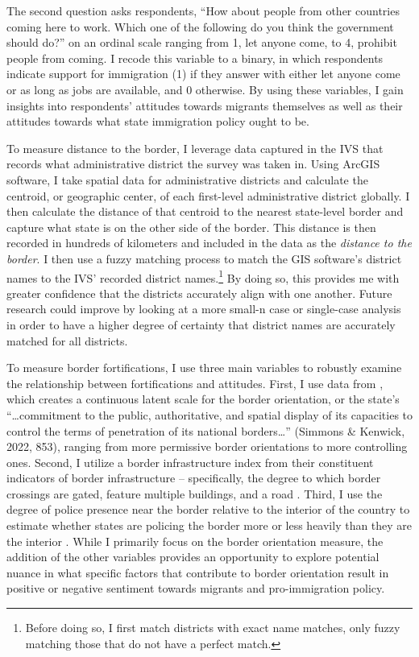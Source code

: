 \documentclass[12pt,]{article}
\begin{document}
The second question asks respondents, ``How about people from other
countries coming here to work. Which one of the following do you think
the government should do?'' on an ordinal scale ranging from 1, let
anyone come, to 4, prohibit people from coming. I recode this variable
to a binary, in which respondents indicate support for immigration (1)
if they answer with either let anyone come or as long as jobs are
available, and 0 otherwise. By using these variables, I gain insights
into respondents' attitudes towards migrants themselves as well as their
attitudes towards what state immigration policy ought to be.

To measure distance to the border, I leverage data captured in the IVS
that records what administrative district the survey was taken in. Using
ArcGIS software, I take spatial data for administrative districts and
calculate the centroid, or geographic center, of each first-level
administrative district globally. I then calculate the distance of that
centroid to the nearest state-level border and capture what state is on
the other side of the border. This distance is then recorded in hundreds
of kilometers and included in the data as the \emph{distance to the
border}. I then use a fuzzy matching process to match the GIS software's
district names to the IVS' recorded district names.\footnote{Before
  doing so, I first match districts with exact name matches, only fuzzy
  matching those that do not have a perfect match.} By doing so, this
provides me with greater confidence that the districts accurately align
with one another. Future research could improve by looking at a more
small-n case or single-case analysis in order to have a higher degree of
certainty that district names are accurately matched for all districts.

To measure border fortifications, I use three main variables to robustly
examine the relationship between fortifications and attitudes. First, I
use data from \citet{simmons2022}, which creates a continuous latent
scale for the border orientation, or the state's ``\ldots commitment to
the public, authoritative, and spatial display of its capacities to
control the terms of penetration of its national borders\ldots{}''
(Simmons \& Kenwick, 2022, 853), ranging from more permissive border
orientations to more controlling ones. Second, I utilize a border
infrastructure index from their constituent indicators of border
infrastructure -- specifically, the degree to which border crossings are
gated, feature multiple buildings, and a road \citep{simmons2022}.
Third, I use the degree of police presence near the border relative to
the interior of the country to estimate whether states are policing the
border more or less heavily than they are the interior
\citep{simmons2022}. While I primarily focus on the border orientation
measure, the addition of the other variables provides an opportunity to
explore potential nuance in what specific factors that contribute to
border orientation result in positive or negative sentiment towards
migrants and pro-immigration policy.
\end{document}
